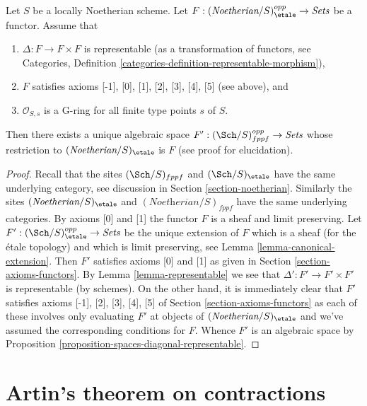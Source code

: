 \begin{proposition}
\label{proposition-spaces-diagonal-representable-noetherian}
Let $S$ be a locally Noetherian scheme. Let
$F : (\textit{Noetherian}/S)_\etale^{opp} \to \textit{Sets}$
be a functor. Assume that
\begin{enumerate}
\item $\Delta : F \to F \times F$ is representable
(as a transformation of functors, see
Categories, Definition \ref{categories-definition-representable-morphism}),
\item $F$ satisfies axioms [-1], [0], [1], [2], [3], [4], [5]
(see above), and
\item $\mathcal{O}_{S, s}$ is a G-ring for all finite type points $s$ of $S$.
\end{enumerate}
Then there exists a unique algebraic space
$F' : (\Sch/S)_{fppf}^{opp} \to \textit{Sets}$
whose restriction to $(\textit{Noetherian}/S)_\etale$ is $F$
(see proof for elucidation).
\end{proposition}

\begin{proof}
Recall that the sites $(\Sch/S)_{fppf}$ and $(\Sch/S)_\etale$ have the same
underlying category, see discussion in Section \ref{section-noetherian}.
Similarly the sites $(\textit{Noetherian}/S)_\etale$ and
$(\textit{Noetherian}/S)_{fppf}$ have the same underlying categories.
By axioms [0] and [1] the functor $F$ is a sheaf and
limit preserving.
Let $F' : (\Sch/S)_\etale^{opp} \to \textit{Sets}$
be the unique extension of $F$ which is a sheaf (for the \'etale topology)
and which is limit preserving, see
Lemma \ref{lemma-canonical-extension}.
Then $F'$ satisfies axioms [0] and [1] as given in
Section \ref{section-axioms-functors}.
By Lemma \ref{lemma-representable} we see that
$\Delta' : F' \to F' \times F'$ is representable (by schemes).
On the other hand, it is immediately clear that
$F'$ satisfies axioms [-1], [2], [3], [4], [5] of
Section \ref{section-axioms-functors}
as each of these involves only evaluating $F'$ at objects
of $(\textit{Noetherian}/S)_\etale$ and we've assumed the
corresponding conditions for $F$.
Whence $F'$ is an algebraic space by
Proposition \ref{proposition-spaces-diagonal-representable}.
\end{proof}












\section{Artin's theorem on contractions}
\label{section-contractions}

